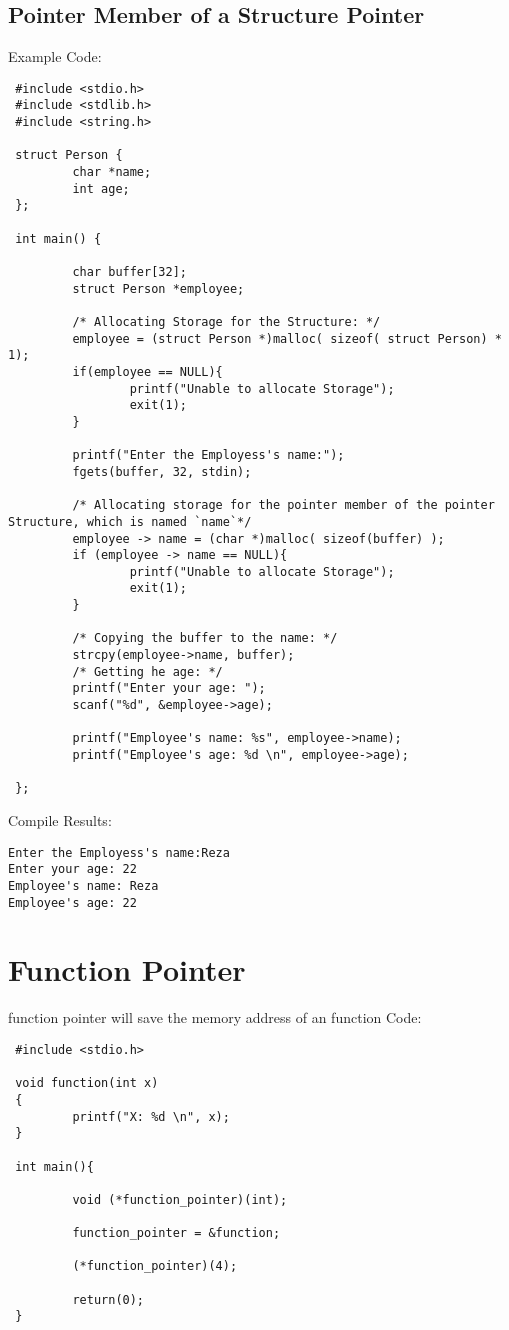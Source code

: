 \subsection{Pointer Member of a Structure Pointer}
Example Code:
\begin{lstlisting} 
 #include <stdio.h>
 #include <stdlib.h>
 #include <string.h>

 struct Person {
         char *name;
         int age;
 };

 int main() {

         char buffer[32];
         struct Person *employee;

         /* Allocating Storage for the Structure: */
         employee = (struct Person *)malloc( sizeof( struct Person) * 1);
         if(employee == NULL){
                 printf("Unable to allocate Storage");
                 exit(1);
         }

         printf("Enter the Employess's name:");
         fgets(buffer, 32, stdin);

         /* Allocating storage for the pointer member of the pointer Structure, which is named `name`*/
         employee -> name = (char *)malloc( sizeof(buffer) );
         if (employee -> name == NULL){
                 printf("Unable to allocate Storage");
                 exit(1);
         }

         /* Copying the buffer to the name: */
         strcpy(employee->name, buffer);
         /* Getting he age: */
         printf("Enter your age: ");
         scanf("%d", &employee->age);

         printf("Employee's name: %s", employee->name);
         printf("Employee's age: %d \n", employee->age);

 };
\end{lstlisting}

Compile Results:
\begin{lstlisting} 
Enter the Employess's name:Reza
Enter your age: 22
Employee's name: Reza
Employee's age: 22
\end{lstlisting}

\section{Function Pointer}
function pointer will save the memory address of an function
Code:
\begin{lstlisting} 
 #include <stdio.h>

 void function(int x)
 {
         printf("X: %d \n", x);
 }

 int main(){

         void (*function_pointer)(int);

         function_pointer = &function;

         (*function_pointer)(4);

         return(0);
 }
\end{lstlisting}

